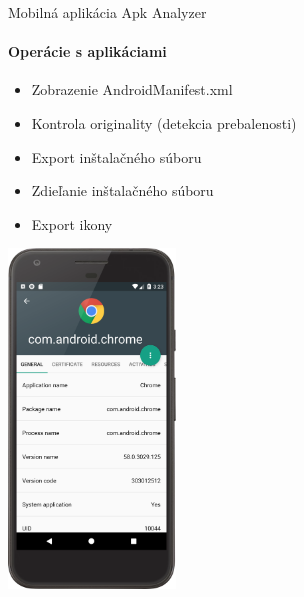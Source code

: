 \documentclass{beamer}
\begin{document}
  \begin{frame}[label=lists]{Mobilná aplikácia Apk Analyzer}
 	 \framesubtitle{Operácie s aplikáciami}
	\begin{minipage}[htb]{\textwidth}
		\begin{minipage}[t]{0.5\textwidth}
			\hbox{}
			\hbox{}
			\begin{itemize}
 				\item Zobrazenie AndroidManifest.xml
				\item Kontrola originality (detekcia prebalenosti)
				\item Export inštalačného súboru
				\item Zdieľanie inštalačného súboru
				\item Export ikony
			\end{itemize}
     		\vfill
		\end{minipage}%
	\hfill
	\centering
		\begin{minipage}[t][][b]{0.4\textwidth}
		\centering
		\includegraphics[height=9cm]{images/app/detail_device.png}
		\label{fig:app-detail}
		\end{minipage}%
	\end{minipage}
  \end{frame}   
\end{document}
